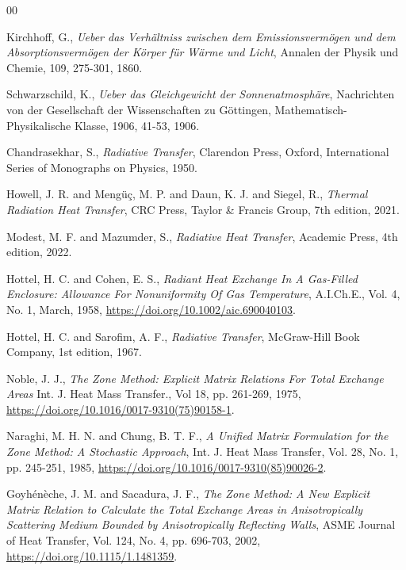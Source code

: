 \documentclass[preprint,1p,times]{elsarticle}
\theoremstyle{plain}
\theoremstyle{definition}
\theoremstyle{remark}
\begin{document}
\begin{thebibliography}{00}

	Kirchhoff, G.,
	\textit{Ueber das Verhältniss zwischen dem Emissionsvermögen und dem Absorptionsvermögen der Körper für Wärme und Licht},
	Annalen der Physik und Chemie,
	109, 275-301,
	1860.
	
	Schwarzschild, K.,
	\textit{Ueber das Gleichgewicht der Sonnenatmosphäre},
	Nachrichten von der Gesellschaft der Wissenschaften zu Göttingen, Mathematisch-Physikalische Klasse,
	1906, 41-53,
	1906.
	
	Chandrasekhar, S.,
	\textit{Radiative Transfer},
	Clarendon Press, Oxford,
	International Series of Monographs on Physics,
	1950.

	Howell, J. R. and Mengü\c{c}, M. P. and Daun, K. J. and Siegel, R.,
	\textit{Thermal Radiation Heat Transfer},
	CRC Press, Taylor \& Francis Group,
	7th edition,
	2021.
  
	Modest, M. F. and Mazumder, S.,
	\textit{Radiative Heat Transfer},
	Academic Press,
	4th edition,
	2022.
	
	Hottel, H. C. and Cohen, E. S.,
	\textit{Radiant Heat Exchange In A Gas-Filled Enclosure: Allowance For Nonuniformity Of Gas Temperature},
	A.I.Ch.E., Vol. 4, No. 1,
	March, 1958,
	\url{https://doi.org/10.1002/aic.690040103}.
		
	Hottel, H. C. and Sarofim, A. F.,
	\textit{Radiative Transfer},
	McGraw-Hill Book Company,
	1st edition,
	1967.
	
	Noble, J. J.,
	\textit{The Zone Method: Explicit Matrix Relations For Total Exchange Areas}
	Int. J. Heat Mass Transfer.,
	Vol 18, pp. 261-269, 1975,
	\url{https://doi.org/10.1016/0017-9310(75)90158-1}.

	Naraghi, M. H. N. and Chung, B. T. F.,
	\textit{A Unified Matrix Formulation for the Zone Method: A Stochastic Approach},
	Int. J. Heat Mass Transfer,
	Vol. 28, No. 1, pp. 245-251, 1985,
	\url{https://doi.org/10.1016/0017-9310(85)90026-2}.

	Goyh\'en\`eche, J. M. and Sacadura, J. F.,
	\textit{The Zone Method: A New Explicit Matrix Relation to Calculate the Total Exchange Areas in Anisotropically Scattering Medium Bounded by Anisotropically Reflecting Walls},
	ASME Journal of Heat Transfer,
	Vol. 124, No. 4, pp. 696-703, 2002,
	\url{https://doi.org/10.1115/1.1481359}.


\end{thebibliography}
\end{document}
